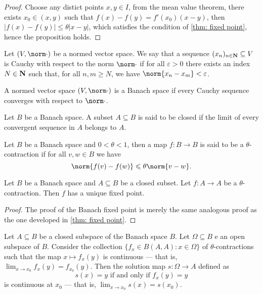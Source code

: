 \begin{proof}
Choose any distict points \(x, y \in I\), from the mean value theorem, there
exists \(x_0 \in (x, y)\) such that \(f(x) - f(y) = f'(x_0)(x - y)\), then
\(|f(x) - f(y)| \leq \theta |x - y|\), which satisfies the condition of
\cref{thm: fixed point}, hence the proposition holds.
\end{proof}

\begin{definition}
Let \((V, \norm \cdot)\) be a normed vector space. We say that a sequence
\((x_n)_{n \in \mathbf{N}} \subseteq V\) is Cauchy with respect to the norm \(\norm \cdot\) if for all
\(\varepsilon > 0\) there exists an index \(N \in \mathbf{N}\) such that, for all \(n, m \geq N\), we
have \(\norm{x_n - x_m} < \varepsilon\).
\end{definition}


\begin{definition}\label{def: Banach space}
A normed vector space \((V, \norm \cdot)\) is a Banach space if every Cauchy
sequence converges with respect to \(\norm \cdot\).
\end{definition}

\begin{definition}
Let \(B\) be a Banach space. A subset \(A \subseteq B\) is said to be closed
if the limit of every convergent sequence in \(A\) belongs to \(A\).
\end{definition}

\begin{definition}[Contraction]
\label{def:contraction}
Let \(B\) be a Banach space and \(0 < \theta < 1\), then a map \(f: B \to B\)
is said to be a \(\theta\)-contraction if for all \(v, w \in B\) we have
\[
\norm{f(v) - f(w)} \leq \theta \norm{v - w}.
\]
\end{definition}

\begin{theorem}\label{thm: Banach fixed point}
Let \(B\) be a Banach space and \(A \subseteq B\) be a closed subset. Let \(f:
A \to A\) be a \(\theta\)-contraction. Then \(f\) has a unique fixed point.
\end{theorem}

\begin{proof}
The proof of the Banach fixed point is merely the same analogous proof as the
one developed in \cref{thm: fixed point}.
\end{proof}

\begin{proposition}
\label{prop:fixed-point-stability}
Let \(A \subseteq B\) be a closed subspace of the Banach space \(B\). Let \(\Omega \subseteq B\) e
an open subspace of \(B\). Consider the collection \(\{f_{x} \in B(A, A) : x \in
\Omega\}\)   of \(\theta\)-contractions such that the map \(x \mapsto f_x(y)\) is continuous ---
that is, \(\lim_{x\to x_0} f_x(y) = f_{x_0}(y)\).
Then the solution map \(s: \Omega \to A\) defined as
\[
s(x) = y \text{ if and only if } f_x(y) = y
\]
is continuous at \(x_0\) --- that is, \(\lim_{x \to x_0} s(x) = s(x_0)\).
\end{proposition}

